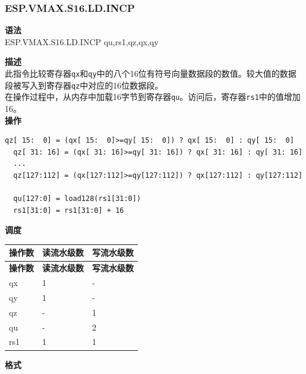 \newpage

\newpage
\subsubsection{ESP.VMAX.S16.LD.INCP}\label{instruction:ESPVMAXS16LDINCP}
\textbf{语法}\\
ESP.VMAX.S16.LD.INCP qu,rs1,qz,qx,qy

\textbf{描述}\\
此指令比较寄存器\lstinline{qx}和\lstinline{qy}中的八个16位有符号向量数据段的数值。较大值的数据段被写入到寄存器\lstinline{qz}中对应的16位数据段。\\在操作过程中，从内存中加载16字节到寄存器\lstinline{qu}。访问后，寄存器\lstinline{rs1}中的值增加16。\\
\textbf{操作}
\begin{lstlisting}[escapeinside=`?]
  qz[ 15:  0] = (qx[ 15:  0]>=qy[ 15:  0]) ? qx[ 15:  0] : qy[ 15:  0]
  qz[ 31: 16] = (qx[ 31: 16]>=qy[ 31: 16]) ? qx[ 31: 16] : qy[ 31: 16]
  ...
  qz[127:112] = (qx[127:112]>=qy[127:112]) ? qx[127:112] : qy[127:112]

  qu[127:0] = load128(rs1[31:0])
  rs1[31:0] = rs1[31:0] + 16
\end{lstlisting}

\textbf{调度}\\
\begin{longtable}[c]{|l|l|l|}
    \hline
    \rowcolor{lightgray}
    \textbf{操作数} & \textbf{读流水级数} & \textbf{写流水级数} \\\hline
    \endfirsthead
    \hline
    \rowcolor{lightgray}
     \textbf{操作数} & \textbf{读流水级数} & \textbf{写流水级数} \\\hline
    \endhead
    \hline
    \endfoot

    qx & 1 & - \\\hline
  qy & 1 & - \\\hline
     qz & - & 1 \\\hline
     qu & - & 2 \\\hline
     rs1 & 1 & 1

\end{longtable}

\textbf{格式}\\


